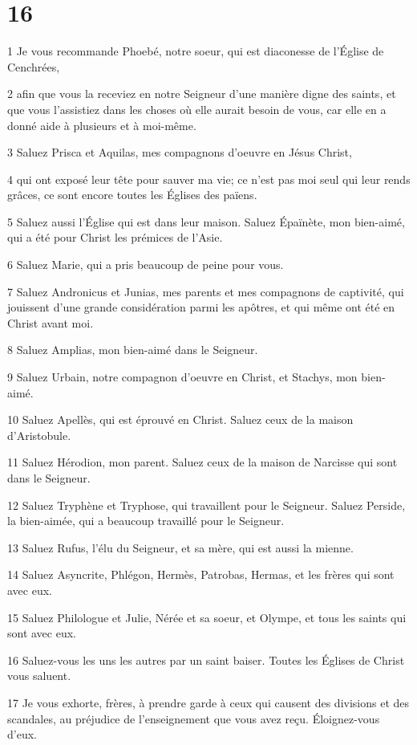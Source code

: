 \chapter{16}

\par 1 Je vous recommande Phoebé, notre soeur, qui est diaconesse de l'Église de Cenchrées,
\par 2 afin que vous la receviez en notre Seigneur d'une manière digne des saints, et que vous l'assistiez dans les choses où elle aurait besoin de vous, car elle en a donné aide à plusieurs et à moi-même.
\par 3 Saluez Prisca et Aquilas, mes compagnons d'oeuvre en Jésus Christ,
\par 4 qui ont exposé leur tête pour sauver ma vie; ce n'est pas moi seul qui leur rends grâces, ce sont encore toutes les Églises des païens.
\par 5 Saluez aussi l'Église qui est dans leur maison. Saluez Épaïnète, mon bien-aimé, qui a été pour Christ les prémices de l'Asie.
\par 6 Saluez Marie, qui a pris beaucoup de peine pour vous.
\par 7 Saluez Andronicus et Junias, mes parents et mes compagnons de captivité, qui jouissent d'une grande considération parmi les apôtres, et qui même ont été en Christ avant moi.
\par 8 Saluez Amplias, mon bien-aimé dans le Seigneur.
\par 9 Saluez Urbain, notre compagnon d'oeuvre en Christ, et Stachys, mon bien-aimé.
\par 10 Saluez Apellès, qui est éprouvé en Christ. Saluez ceux de la maison d'Aristobule.
\par 11 Saluez Hérodion, mon parent. Saluez ceux de la maison de Narcisse qui sont dans le Seigneur.
\par 12 Saluez Tryphène et Tryphose, qui travaillent pour le Seigneur. Saluez Perside, la bien-aimée, qui a beaucoup travaillé pour le Seigneur.
\par 13 Saluez Rufus, l'élu du Seigneur, et sa mère, qui est aussi la mienne.
\par 14 Saluez Asyncrite, Phlégon, Hermès, Patrobas, Hermas, et les frères qui sont avec eux.
\par 15 Saluez Philologue et Julie, Nérée et sa soeur, et Olympe, et tous les saints qui sont avec eux.
\par 16 Saluez-vous les uns les autres par un saint baiser. Toutes les Églises de Christ vous saluent.
\par 17 Je vous exhorte, frères, à prendre garde à ceux qui causent des divisions et des scandales, au préjudice de l'enseignement que vous avez reçu. Éloignez-vous d'eux.
